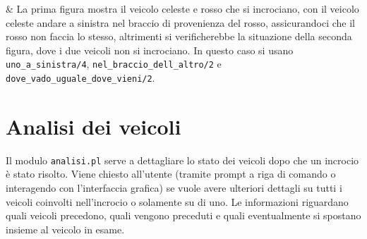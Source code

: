 \begin{center}
\begin{longtabu}
		 & La prima figura mostra il veicolo celeste e rosso che si incrociano, con il veicolo celeste andare a sinistra nel braccio di provenienza del rosso, assicurandoci che il rosso non faccia lo stesso, altrimenti si verificherebbe la situazione della seconda figura, dove i due veicoli non si incrociano. In questo caso si usano \texttt{uno\_a\_sinistra/4}, \texttt{nel\_braccio\_dell\_altro/2} e \texttt{dove\_vado\_uguale\_dove\_vieni/2}.
	\end{longtabu}
\end{center}

\section{Analisi dei veicoli}
Il modulo \texttt{analisi.pl} serve a dettagliare lo stato dei veicoli dopo che un incrocio è stato risolto. Viene chiesto all'utente (tramite prompt a riga di comando o interagendo con l'interfaccia grafica) se vuole avere ulteriori dettagli su tutti i veicoli coinvolti nell'incrocio o solamente su di uno. Le informazioni riguardano quali veicoli precedono, quali vengono preceduti e quali eventualmente si spostano insieme al veicolo in esame.

